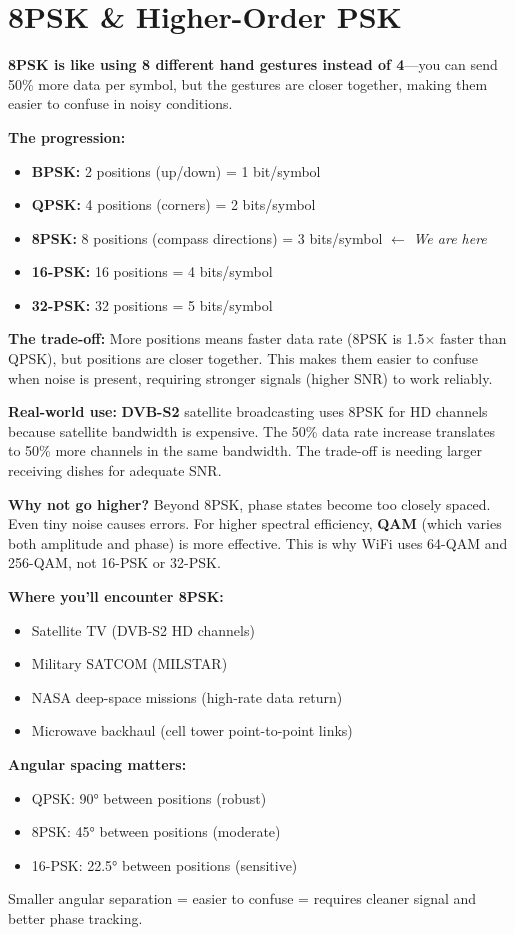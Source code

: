 \chapter{8PSK \& Higher-Order PSK}
\label{ch:8psk}

\begin{nontechnical}
\textbf{8PSK is like using 8 different hand gestures instead of 4}---you can send 50\% more data per symbol, but the gestures are closer together, making them easier to confuse in noisy conditions.

\textbf{The progression:}
\begin{itemize}
\item \textbf{BPSK:} 2 positions (up/down) = 1 bit/symbol
\item \textbf{QPSK:} 4 positions (corners) = 2 bits/symbol
\item \textbf{8PSK:} 8 positions (compass directions) = 3 bits/symbol $\leftarrow$ \emph{We are here}
\item \textbf{16-PSK:} 16 positions = 4 bits/symbol
\item \textbf{32-PSK:} 32 positions = 5 bits/symbol
\end{itemize}

\textbf{The trade-off:} More positions means faster data rate (8PSK is 1.5$\times$ faster than QPSK), but positions are closer together. This makes them easier to confuse when noise is present, requiring stronger signals (higher SNR) to work reliably.

\textbf{Real-world use:} \textbf{DVB-S2} satellite broadcasting uses 8PSK for HD channels because satellite bandwidth is expensive. The 50\% data rate increase translates to 50\% more channels in the same bandwidth. The trade-off is needing larger receiving dishes for adequate SNR.

\textbf{Why not go higher?} Beyond 8PSK, phase states become too closely spaced. Even tiny noise causes errors. For higher spectral efficiency, \textbf{QAM} (which varies both amplitude and phase) is more effective. This is why WiFi uses 64-QAM and 256-QAM, not 16-PSK or 32-PSK.

\textbf{Where you'll encounter 8PSK:}
\begin{itemize}
\item Satellite TV (DVB-S2 HD channels)
\item Military SATCOM (MILSTAR)
\item NASA deep-space missions (high-rate data return)
\item Microwave backhaul (cell tower point-to-point links)
\end{itemize}

\textbf{Angular spacing matters:}
\begin{itemize}
\item QPSK: 90° between positions (robust)
\item 8PSK: 45° between positions (moderate)
\item 16-PSK: 22.5° between positions (sensitive)
\end{itemize}
Smaller angular separation = easier to confuse = requires cleaner signal and better phase tracking.
\end{nontechnical}

